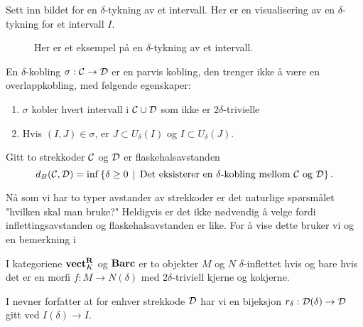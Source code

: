 Sett inn bildet for en $\delta$-tykning av et intervall.
Her er en visualisering av en $\delta$-tykning for et
intervall $I$.

\begin{figure}[h]
  \centering
  \scalebox{0.5}{}
  \caption{Her er et eksempel på en $\delta$-tykning av et
  intervall.}
  \label{fig:delta-tykk}
\end{figure}

\begin{definisjon}\label{def:delta-kobling}
En $\delta$-kobling $\sigma:\mathcal{C}\to \mathcal{D}$ er en parvis
  kobling, den trenger ikke å være en overlappkobling, med
  følgende egenskaper:
\begin{enumerate}
    \item $\sigma$ kobler hvert intervall
      i $\mathcal{C}\cup\mathcal{D}$ som ikke er $2\delta$-trivielle\\
    \item Hvis $(I,J)\in\sigma$, er $J\subset U_\delta(I)$
      og $I\subset U_\delta(J)$.
\end{enumerate}
\end{definisjon}

\begin{definisjon}\label{def:FlaskAvst}
Gitt to strekkoder $\mathcal{C}$ og $\mathcal{D}$ er flaskehalsavstanden
\[d_B(\mathcal{C},\mathcal{D}) = \inf\left\{\delta\geq 0\,\mid\,\text{Det
  eksisterer en $\delta$-kobling mellom $\mathcal{C}$ og
  $\mathcal{D}$}\right\}.\]
\end{definisjon}

Nå som vi har to typer avstander av strekkoder er det
naturlige spørsmålet "hvilken skal man bruke?" Heldigvis
er det ikke nødvendig å velge fordi inflettingsavstanden
og flaskehalsavstanden er like. For å vise dette bruker vi
\citep[proposisjon 4.2]{Bauer2020} og en bemerkning
i \citep[seksjon 4.2]{Bauer2020}

\begin{proposisjon}\label{prop:Prop2.4-Bauer2020}
  I kategoriene $\textnormal{\textbf{vect}}_K^{\textnormal{\textbf{{R}}}}$ og $\textnormal{\textbf{Barc}}$ er to objekter $M$ og $N$
  $\delta$-inflettet hvis og bare hvis det er en morfi $f: M\to
  N(\delta)$ med $2\delta$-triviell kjerne og kokjerne.
\end{proposisjon}

\begin{bemerk}\label{bem:r_delta}
  I \citep[seksjon 4.2]{Bauer2020} nevner forfatter at for
  enhver strekkode $\mathcal{D}$ har vi en bijeksjon 
  $r_\delta:\mathcal{D}(\delta)\to\mathcal{D}$ gitt ved $I(\delta)\to
  I$.
\end{bemerk}

